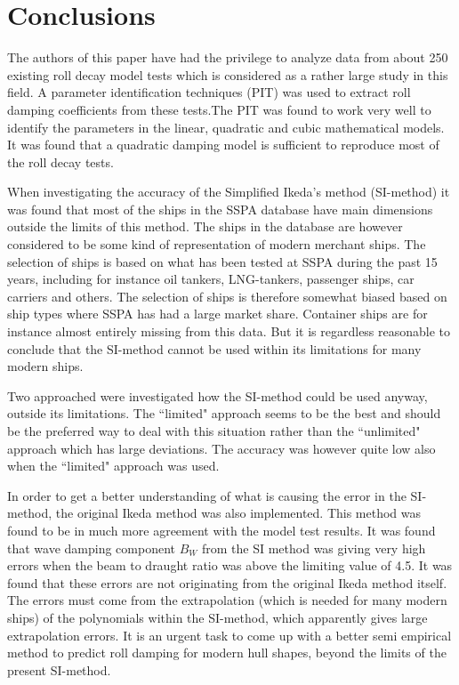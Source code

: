 \section{Conclusions}
\label{se:conclusions}
The authors of this paper have had the privilege to analyze data from about 250 existing roll decay model tests which is considered as a rather large study in this field. A parameter identification techniques (PIT) was used to extract roll damping coefficients from these tests.The PIT was found to work very well to identify the parameters in the linear, quadratic and cubic mathematical models. 
It was found that a quadratic damping model is sufficient to reproduce most of the roll decay tests.

When investigating the accuracy of the Simplified Ikeda's method (SI-method) it was found that most of the ships in the SSPA database have main dimensions outside the limits of this method. The ships in the database are however considered to be some kind of representation of modern merchant ships. The selection of ships is based on what has been tested at SSPA during the past 15 years, including for instance oil tankers, LNG-tankers, passenger ships, car carriers and others. The selection of ships is therefore somewhat biased based on ship types where SSPA has had a large market share. Container ships are for instance almost entirely missing from this data. But it is regardless reasonable to conclude that the SI-method cannot be used within its limitations for many modern ships. 

Two approached were investigated how the SI-method could be used anyway, outside its limitations. The ``limited" approach seems to be the best and should be the preferred way to deal with this situation rather than the ``unlimited" approach which has large deviations. The accuracy was however quite low also when the  ``limited" approach was used.

In order to get a better understanding of what is causing the error in the SI-method, the original Ikeda method was also implemented. This method was found to be in much more agreement with the model test results. It was found that wave damping component $B_W$ from the SI method was giving very high errors when the beam to draught ratio was above the limiting value of 4.5. It was found that these errors are not originating from the original Ikeda method itself. The errors must come from the extrapolation (which is needed for many modern ships) of the polynomials within the SI-method, which apparently gives large extrapolation errors. It is an urgent task to come up with a better semi empirical method to predict roll damping for modern hull shapes, beyond the limits of the present SI-method. 

